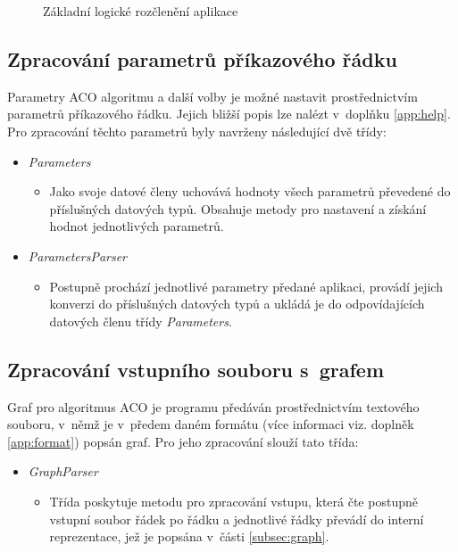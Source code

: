 \documentclass[a4paper, 12pt]{article}
\begin{document}
\begin{figure}[b]
  \begin{center}
    
  \end{center}
\caption{Základní logické rozčlenění aplikace}
\label{img:logika}
\end{figure}


\subsection{Zpracování parametrů příkazového řádku}
\label{subsec:process}
Parametry ACO algoritmu a další volby je možné nastavit prostřednictvím parametrů příkazového řádku. Jejich bližší popis lze nalézt v~doplňku \ref{app:help}.
Pro zpracování těchto parametrů byly navrženy následující dvě třídy:
\begin{itemize}
  \item \emph{Parameters}
  \begin{itemize}
    \item[] Jako svoje datové členy uchovává hodnoty všech parametrů převedené do příslušných datových typů.
    Obsahuje metody pro nastavení a získání hodnot jednotlivých parametrů.
  \end{itemize}
  \item \emph{ParametersParser}
  \begin{itemize}
    \item[] Postupně prochází jednotlivé parametry předané aplikaci, provádí jejich konverzi do příslušných datových typů a ukládá je do odpovídajících
    datových členu třídy \emph{Parameters}.
  \end{itemize}
\end{itemize}

\subsection{Zpracování vstupního souboru s~grafem}
Graf pro algoritmus ACO je programu předáván prostřednictvím textového souboru, v~němž je v~předem daném formátu (více informaci viz. doplněk \ref{app:format})
popsán graf. Pro jeho zpracování slouží tato třída:
\begin{itemize}
  \item \emph{GraphParser}
  \begin{itemize}
    \item[] Třída poskytuje metodu pro zpracování vstupu, která čte postupně vstupní soubor řádek po řádku a jednotlivé řádky převádí do interní reprezentace,
    jež je popsána v~části \ref{subsec:graph}.
  \end{itemize}
\end{itemize}
\end{document}
